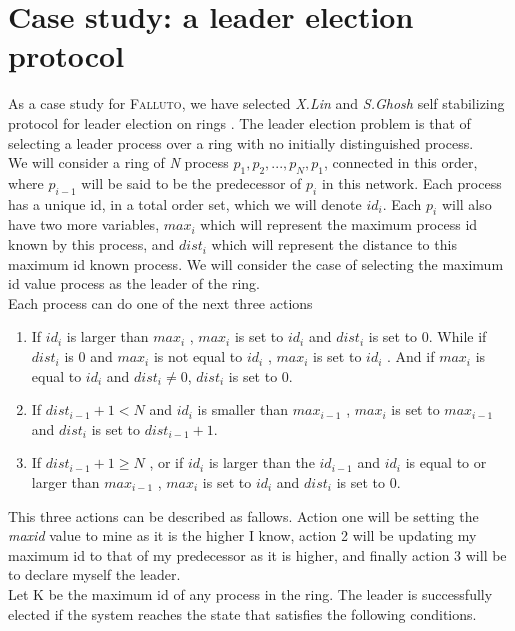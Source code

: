 \documentclass{llncs2e/llncs}
\newcommand{\falluto}{\nohyphens{\textsc{Falluto}}}
\begin{document}
\section{Case study: a leader election protocol}
As a case study for \falluto, we have selected \textit{X.Lin} and \textit{S.Ghosh} self stabilizing protocol for leader election on rings \cite{linghosh,ghoshgupta,yokogawa,hammes}. The leader election problem is that of selecting a leader process over a ring with no initially distinguished process.\\
We will consider a ring of \textit{N} process $p_1,p_2,...,p_N,p_1$, connected in this order, where $p_{i-1}$ will be said to be the predecessor of $p_i$ in this network. Each process has a unique id, in a total order set, which we will denote $id_i$. Each $p_i$ will also have two more variables, $max_i$ which will represent the maximum process id known by this process, and $dist_i$ which will represent the distance to this maximum id known process. We will consider the case of selecting the maximum id value process as the leader of the ring.\\
Each process can do one of the next three actions
\begin{enumerate}
\item If $id_i$ is larger than $max_i$ , $max_i$ is set to $id_i$ and $dist_i$ is set to $0$. While if $dist_i$ is $0$ and $max_i$ is not equal to $id_i$ , $max_i$ is set to $id_i$ . And if $max_i$ is equal to $id_i$ and $dist_i \neq 0$, $dist_i$ is set to $0$.

\item If $dist_{i-1} + 1 < N$ and $id_i$ is smaller than $max_{i-1}$ , $max_i$ is set to $max_{i-1}$ and $dist_i$ is set to $dist_{i-1} + 1$.

\item If $dist_{i-1} + 1 \geq N$ , or if $id_i$ is larger than the $id_{i-1}$ and $id_i$ is equal to or larger than $max_{i-1}$ , $max_i$ is set to $id_i$ and $dist_i$ is set to $0$.
\end{enumerate}
This three actions can be described as fallows. Action one will be setting the \textit{maxid} value to mine as it is the higher I know, action 2 will be updating my maximum id to that of my predecessor as it is higher, and finally action 3 will be to declare myself the leader.\\
Let K be the maximum id of any process in the ring. The leader is successfully elected if the system reaches the state that satisfies the following conditions.
\end{document}
